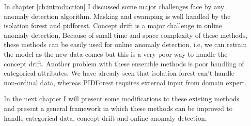 In chapter \ref{ch:introduction} I discussed some major challenges face by any anomaly detection algorithm.
Masking and swamping is well handled by the isolation forest and pidforest. 
Concept drift is a major challenge in online anomaly detection. 
Because of small time and space complexity of these methods, these methods can be easily used for online anomaly detection, i.e, we can retrain the model as the new data comes but this is a very poor way to handle the concept drift.
Another problem with these ensemble methods is poor handling of categorical attributes.
We have already seen that isolation forest can't handle non-ordinal data, whereas PIDForest requires external input from domain expert.

In the next chapter I will present some modifications to these existing methods and present a general framework in which these methods can be improved to handle categorical data, concept drift and online anomaly detection.